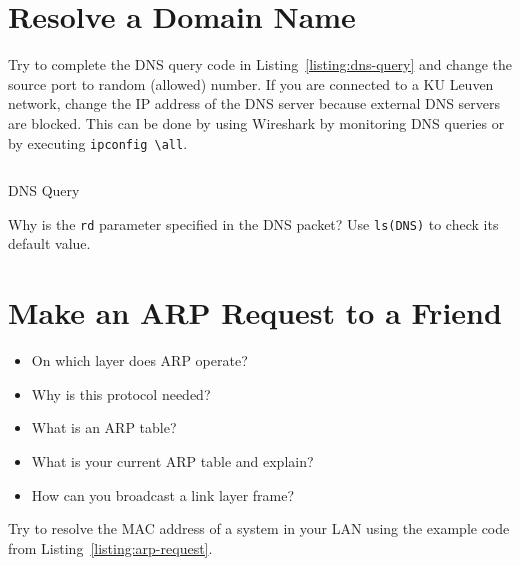 \documentclass[11pt,a4paper]{article}
\begin{document}
\FloatBarrier
\section{Resolve a Domain Name}
\begin{question}
    Try to complete the DNS query code in Listing~\ref{listing:dns-query} and change the source port to random (allowed) number.
    If you are connected to a KU Leuven network, change the IP address of the DNS server because external DNS servers are blocked.
    This can be done by using Wireshark by monitoring DNS queries or by executing \texttt{ipconfig \textbackslash all}. 
\end{question}


\begin{listing}[h]
\inputminted[firstline=16]{python}{../code_students/dns_query.py}
\caption{DNS Query}\label{listing:dns-query}
\end{listing}

\begin{question}
    Why is the \texttt{rd} parameter specified in the DNS packet? Use \texttt{ls(DNS)} to check its default value.
\end{question}



\FloatBarrier
\section{Make an ARP Request to a Friend}
\begin{question}
\begin{itemize}
    \item On which layer does ARP operate?
    \item Why is this protocol needed?
    \item What is an ARP table?
    \item What is your current ARP table and explain?
    \item How can you broadcast a link layer frame?
\end{itemize}
\end{question}

\begin{question}
Try to resolve the MAC address of a system in your LAN using the example code from Listing~\ref{listing:arp-request}.
\end{question}
\end{document}

